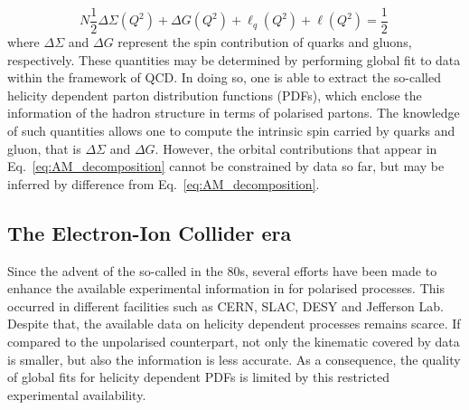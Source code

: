 %
\begin{equation}N
  \frac{1}{2} \Delta \Sigma(Q^2) + \Delta G(Q^2) + \ell_{q}(Q^2) + \ell(Q^2) = \frac{1}{2} \,
  \label{eq:AM_decomposition}
\end{equation}
%
where $\Delta \Sigma$ and $\Delta G$ represent the spin contribution of quarks and gluons, respectively. These quantities may be determined by performing global fit to data within the framework of QCD. In doing so, one is able to extract the so-called helicity dependent parton distribution functions (PDFs), which enclose the information of the hadron structure in terms of polarised partons. The knowledge of such quantities allows one to compute the intrinsic spin carried by quarks and gluon, that is $\Delta \Sigma$ and $\Delta G$. However, the orbital contributions that appear in Eq.~\eqref{eq:AM_decomposition} cannot be constrained by data so far, but may be inferred by difference from Eq.~\eqref{eq:AM_decomposition}.

\subsection*{The Electron-Ion Collider era}

Since the advent of the so-called  in the 80s, several efforts have been made to enhance the available experimental information in for polarised processes. This occurred in different facilities such as CERN, SLAC, DESY and Jefferson Lab. Despite that, the available data on helicity dependent processes remains scarce. If compared to the unpolarised counterpart, not only the kinematic covered by data is smaller, but also the information is less accurate. As a consequence, the quality of global fits for helicity dependent PDFs is limited by this restricted experimental availability. 

